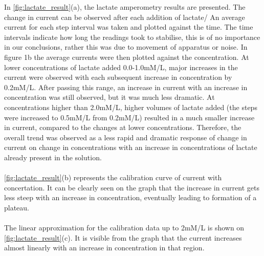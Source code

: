 In \autoref{fig:lactate_result}(a), the lactate amperometry results are presented.  The change in current can be observed after each addition of lactate/ An average current for each step interval was taken and plotted against the time. The time intervals indicate how long the readings took to stabilise, this is of no importance in our conclusions, rather this was due to movement of apparatus or noise. In figure 1b the average currents were then plotted against the concentration. At lower concentrations of lactate added 0.0-1.0mM/L, major increases in the current were observed with each subsequent increase in concentration by 0.2mM/L. After passing this range, an increase in current with an increase in concentration was still observed, but it was much less dramatic. At concentrations higher than 2.0mM/L, higher volumes of lactate added (the steps were increased to 0.5mM/L from 0.2mM/L) resulted in a much smaller increase in current, compared to the changes at lower concentrations. Therefore, the overall trend was observed as a less rapid and dramatic response of change in current on change in concentrations with an increase in concentrations of lactate already present in the solution.  \\\\
\autoref{fig:lactate_result}(b) represents the calibration curve of current with concertation. It can be clearly seen on the graph that the increase in current gets less steep with an increase in concentration, eventually leading to formation of a plateau. \\\\
The linear approximation for the calibration data up to 2mM/L is shown on \autoref{fig:lactate_result}(c). It is visible from the graph that the current increases almost linearly with an increase in concentration in that region. \\\\
